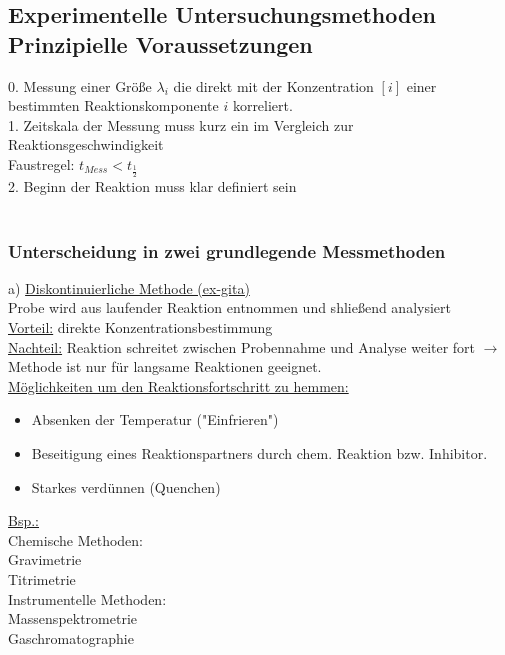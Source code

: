 \documentclass[a4paper, fleqn]{article}
\begin{document}
\subsection{Experimentelle Untersuchungsmethoden Prinzipielle Voraussetzungen}
0. Messung einer Größe $\lambda_i$ die direkt mit der Konzentration $[i]$ einer bestimmten Reaktionskomponente $i$ korreliert.\\
1. Zeitskala der Messung muss kurz ein im Vergleich zur Reaktionsgeschwindigkeit\\
Faustregel: $t_{Mess} < t_\frac{1}{2}$\\
2. Beginn der Reaktion muss klar definiert sein\\\\

\subsubsection{Unterscheidung in zwei grundlegende Messmethoden}
a) \underline{Diskontinuierliche Methode (ex-gita)}\\
Probe wird aus laufender Reaktion entnommen und shließend analysiert\\
\underline{Vorteil:} direkte Konzentrationsbestimmung\\
\underline{Nachteil:} Reaktion schreitet zwischen Probennahme und Analyse weiter fort $\rightarrow$ Methode ist nur für langsame Reaktionen geeignet.\\
\underline{Möglichkeiten um den Reaktionsfortschritt zu hemmen:}\\
\begin{itemize}
    \item Absenken der Temperatur ("Einfrieren")
    \item Beseitigung eines Reaktionspartners durch chem. Reaktion bzw. Inhibitor.
    \item Starkes verdünnen (Quenchen)
\end{itemize}
\underline{Bsp.:}\\
Chemische Methoden:\\
Gravimetrie\\
Titrimetrie\\
Instrumentelle Methoden:\\
Massenspektrometrie\\
Gaschromatographie\\
\end{document}
